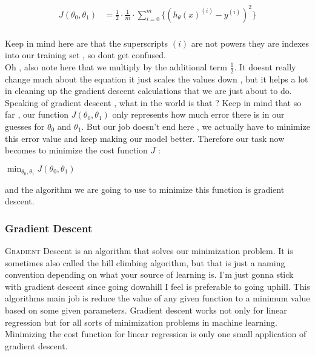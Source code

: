 \[
\begin{aligned}
	J(\theta_{0}, \theta_{1}) & = 
	\frac{1}{2}
	\cdot \frac{1}{m}
	\cdot \sum_{i=0}^{m}
	\{
( h_{\theta}(x)^{(i)} - y^{(i)} )^{2}
\} \\
\end{aligned}
\tag{2}
\]

Keep in mind here are that the superscripts \( (i) \) are not powers they are
indexes into our training set , so dont get confused. \\

Oh , also note here that we multiply by the additional term \( \frac{1}{2} \).
It doesnt really change much about the equation it just scales the values down ,
but it helps a lot in cleaning up the gradient descent calculations that we are
just about to do. \\

Speaking of gradient descent , what in the world is that ? Keep in mind that so
far , our function \( J(\theta_{0}, \theta_{1}) \)  only represents how much
error there is in our guesses for \( \theta_0 \) and \( \theta_1 \). But our job
doesn't end here , we actually have to minimize this error value and keep making
our model better. Therefore our task now becomes to minimize the cost function
\( J \) : 

\( \min_{ \theta_0 , \theta_1 } J(\theta_0,\theta_1) \)

and the algorithm we are going to use to minimize this function is gradient
descent. \\


\subsubsectionend
\subsubsection{Gradient Descent}
\label{sssec:gradient_descent}

\lettrine[lines=3, findent=3pt, nindent=0pt]{G}{radient} Descent is an algorithm
that solves our minimization problem. It is sometimes also called the hill
climbing algorithm, but that is just a naming convention depending on what your
source of learning is. I'm just gonna stick with gradient descent since going
downhill I feel is preferable to going uphill. This algorithms main job
is reduce the value of any given function to a minimum value based on some given
parameters.  Gradient descent works not only for linear regression but for all
sorts of minimization problems in machine learning. Minimizing the cost function
for linear regression is only one small application of gradient descent.

